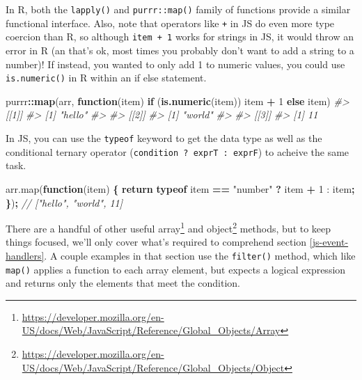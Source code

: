 \documentclass[
  12pt,
]{krantz}
\newenvironment{Shaded}{\begin{snugshade}}{\end{snugshade}}
\newcommand{\AttributeTok}[1]{\textcolor[rgb]{0.77,0.63,0.00}{#1}}
\newcommand{\CommentTok}[1]{\textcolor[rgb]{0.56,0.35,0.01}{\textit{#1}}}
\newcommand{\ControlFlowTok}[1]{\textcolor[rgb]{0.13,0.29,0.53}{\textbf{#1}}}
\newcommand{\DecValTok}[1]{\textcolor[rgb]{0.00,0.00,0.81}{#1}}
\newcommand{\KeywordTok}[1]{\textcolor[rgb]{0.13,0.29,0.53}{\textbf{#1}}}
\newcommand{\NormalTok}[1]{#1}
\newcommand{\OperatorTok}[1]{\textcolor[rgb]{0.81,0.36,0.00}{\textbf{#1}}}
\newcommand{\StringTok}[1]{\textcolor[rgb]{0.31,0.60,0.02}{#1}}
\newcommand{\VariableTok}[1]{\textcolor[rgb]{0.00,0.00,0.00}{#1}}
\renewcommand{\href}[2]{#2\footnote{\url{#1}}}
\begin{document}
In R, both the \texttt{lapply()} and \texttt{purrr::map()} family of functions provide a similar functional interface. Also, note that operators like \texttt{+} in JS do even more type coercion than R, so although \texttt{item\ +\ 1} works for strings in JS, it would throw an error in R (an that's ok, most times you probably don't want to add a string to a number)! If instead, you wanted to only add 1 to numeric values, you could use \texttt{is.numeric()} in R within an if else statement.

\begin{Shaded}
\begin{Highlighting}[]
\NormalTok{purrr}\OperatorTok{::}\KeywordTok{map}\NormalTok{(arr, }\ControlFlowTok{function}\NormalTok{(item) }\ControlFlowTok{if}\NormalTok{ (}\KeywordTok{is.numeric}\NormalTok{(item)) item }\OperatorTok{+}\StringTok{ }\DecValTok{1} \ControlFlowTok{else}\NormalTok{ item)}
\CommentTok{#> [[1]]}
\CommentTok{#> [1] "hello"}
\CommentTok{#> }
\CommentTok{#> [[2]]}
\CommentTok{#> [1] "world"}
\CommentTok{#> }
\CommentTok{#> [[3]]}
\CommentTok{#> [1] 11}
\end{Highlighting}
\end{Shaded}

In JS, you can use the \texttt{typeof} keyword to get the data type as well as the conditional ternary operator (\texttt{condition\ ?\ exprT\ :\ exprF}) to acheive the same task.

\begin{Shaded}
\begin{Highlighting}[]
\VariableTok{arr}\NormalTok{.}\AttributeTok{map}\NormalTok{(}\KeywordTok{function}\NormalTok{(item) }\OperatorTok{\{} \ControlFlowTok{return} \KeywordTok{typeof}\NormalTok{ item }\OperatorTok{==} \StringTok{"number"} \OperatorTok{?}\NormalTok{ item }\OperatorTok{+} \DecValTok{1}\NormalTok{ : item}\OperatorTok{;} \OperatorTok{\}}\NormalTok{)}\OperatorTok{;}
\CommentTok{// ["hello", "world", 11]}
\end{Highlighting}
\end{Shaded}

There are a handful of other useful \href{https://developer.mozilla.org/en-US/docs/Web/JavaScript/Reference/Global_Objects/Array}{array} and \href{https://developer.mozilla.org/en-US/docs/Web/JavaScript/Reference/Global_Objects/Object}{object} methods, but to keep things focused, we'll only cover what's required to comprehend section \ref{js-event-handlers}. A couple examples in that section use the \texttt{filter()} method, which like \texttt{map()} applies a function to each array element, but expects a logical expression and returns only the elements that meet the condition.
\end{document}
